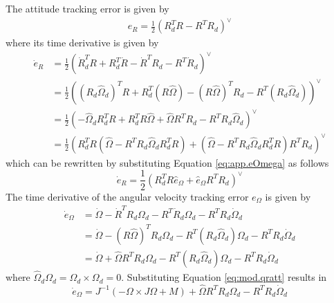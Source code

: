 The attitude tracking error is given by
\begin{equation}\label{key}
\begin{aligned}
e_R=\frac{1}{2}(R_d^TR-R^TR_d)^\vee
\end{aligned}
\end{equation}
where its time derivative is given by
\begin{equation}\label{key}
\begin{aligned}
\dot{e}_R&=\frac{1}{2}(\dot{R}_d^TR+R_d^T\dot{R}-\dot{R}^TR_d-R^T\dot{R}_d)^\vee\\
&=\frac{1}{2}((R_d\hat{\Omega}_d)^TR+R_d^T(R\hat{\Omega})-(R\hat{\Omega})^TR_d-R^T(R_d\hat{\Omega}_d))^\vee\\
&=\frac{1}{2}(-\hat{\Omega}_dR_d^TR+R_d^TR\hat{\Omega}+\hat{\Omega}R^TR_d-R^TR_d\hat{\Omega}_d)^\vee\\
&=\frac{1}{2}(R_d^TR(\hat{\Omega}-R^TR_d\hat{\Omega}_dR_d^TR)+(\hat{\Omega}-R^TR_d\hat{\Omega}_dR_d^TR)R^TR_d)^\vee
\end{aligned}
\end{equation}
which can be rewritten by substituting Equation \ref{eq:app.eOmega} as follows
\begin{equation}\label{key}
\dot{e}_R=\frac{1}{2}(R_d^TR\hat{e}_\Omega+\hat{e}_\Omega R^TR_d)^\vee
\end{equation}
The time derivative of the angular velocity tracking error $ e_\Omega $ is given by
\begin{equation}\label{key}
\begin{aligned}
\dot{e}_\Omega&=\dot{\Omega}-\dot{R}^TR_d\Omega_d-R^T\dot{R}_d\Omega_d-R^TR_d\dot{\Omega}_d\\
&=\dot{\Omega}-(R\hat{\Omega})^TR_d\Omega_d-R^T({R}_d\hat{\Omega}_d)\Omega_d-R^TR_d\dot{\Omega}_d\\
&=\dot{\Omega}+\hat{\Omega}R^TR_d\Omega_d-R^T({R}_d\hat{\Omega}_d)\Omega_d-R^TR_d\dot{\Omega}_d
\end{aligned}
\end{equation}
where $\hat{\Omega}_d\Omega_d=\Omega_d \times \Omega_d=0  $. Substituting Equation \ref{eq:mod.qratt} results in 
\begin{equation}\label{key}
\dot{e}_\Omega=J^{-1}(-\Omega\times J\Omega + M)+\hat{\Omega}R^TR_d\Omega_d-R^TR_d\dot{\Omega}_d
\end{equation}

